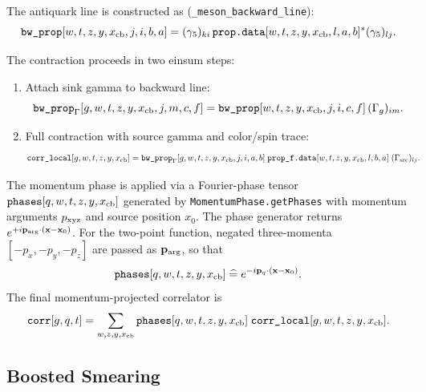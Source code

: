 \documentclass[11pt,a4paper]{article}
\begin{document}
The antiquark line is constructed as (\verb|_meson_backward_line|):
\begin{equation}
  \texttt{bw\_prop}[w,t,z,y,x_{\rm cb},j,i,b,a]
  =
  (\gamma_5)_{k i}\,
  \texttt{prop.data}[w,t,z,y,x_{\rm cb},l,a,b]^*
  (\gamma_5)_{l j}.
\end{equation}

The contraction proceeds in two einsum steps:
\begin{enumerate}[nosep]
  \item Attach sink gamma to backward line:
  \begin{equation}
    \texttt{bw\_prop}_{\Gamma}[g,w,t,z,y,x_{\rm cb},j,m,c,f]
    =
    \texttt{bw\_prop}[w,t,z,y,x_{\rm cb},j,i,c,f]\,
    (\Gamma_g)_{i m}.
  \end{equation}
  \item Full contraction with source gamma and color/spin trace:
  \begin{align}
    \texttt{corr\_local}[g,w,t,z,y,x_{\rm cb}]
    &=
    \texttt{bw\_prop}_{\Gamma}[g,w,t,z,y,x_{\rm cb},j,i,a,b]\;
    \texttt{prop\_f.data}[w,t,z,y,x_{\rm cb},l,b,a]\;
    (\Gamma_{\rm src})_{l j}.
  \end{align}
\end{enumerate}

The momentum phase is applied via a Fourier-phase tensor
$\texttt{phases}[q, w, t, z, y, x_{\rm cb}]$ generated by
\verb|MomentumPhase.getPhases| with momentum arguments $p_{\rm xyz}$ and source
position $x_0$.  The phase generator returns
$e^{+i\mathbf{p}_{\rm arg}\cdot(\mathbf{x}-\mathbf{x}_0)}$.  For the
two-point function, negated three-momenta $[-p_x,-p_y,-p_z]$ are passed as
$\mathbf p_{\rm arg}$, so that
\begin{equation}
  \texttt{phases}[q,w,t,z,y,x_{\rm cb}]
  \;\widehat{=}\;
  e^{-i\mathbf{p}_q\cdot(\mathbf{x}-\mathbf{x}_0)}.
\end{equation}
The final momentum-projected correlator is
\begin{equation}
  \texttt{corr}[g,q,t]
  =
  \sum_{w,z,y,x_{\rm cb}}
  \texttt{phases}[q,w,t,z,y,x_{\rm cb}]\;
  \texttt{corr\_local}[g,w,t,z,y,x_{\rm cb}].
\end{equation}

\subsection{Boosted Smearing}
\end{document}
